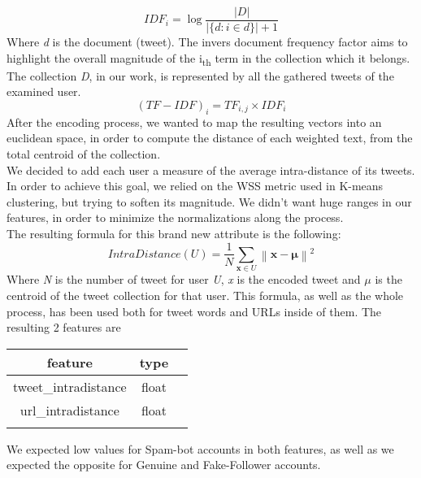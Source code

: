 \[ IDF_{i} =\log {\frac {|D|}{|\{d:i\in d\}| + 1}} \]
Where \textit{d} is the document (tweet).
The invers document frequency factor aims to highlight the overall magnitude of the  i\textsubscript{th} term in the collection  which it belongs. The collection \textit{D}, in our work, is represented by all the gathered tweets of the examined user.
\[(TF-IDF)_{i} = TF_{i,j} \times IDF_{i} \]
After the encoding process, we wanted to map the resulting vectors into an euclidean space, in order to compute the distance of each weighted text, from the total centroid of the collection.\\
We decided to add each user a measure of the average intra-distance of its tweets.\\
In order to achieve this goal, we relied on the WSS metric used in K-means clustering, but trying to soften its magnitude. We didn't want huge ranges in our features, in order to minimize the normalizations along the process.\\
The resulting formula for this brand new attribute is the following:
\[IntraDistance(U) = \frac{1}{N}\sum _{\mathbf {x} \in U}\left\|\mathbf {x} -{\boldsymbol {\mu }}\right\|^{2}\]
Where \textit{N} is the number of tweet for user \textit{U}, \textit{x} is the encoded tweet and $\mu$ is the centroid of the tweet collection for that user.
This formula, as well as the whole process, has been used both for tweet words and URLs inside of them.
The resulting 2 features are
\small
\begin{center}
	\begin{tabular}{ccc}
		\\feature&type\\
		\hline\hline
		tweet\_intradistance&float\\
		url\_intradistance&float\\\hline\\
	\end{tabular}
\end{center}
\normalsize
We expected low values for Spam-bot accounts in both features, as well as we expected the opposite for Genuine and Fake-Follower accounts.



